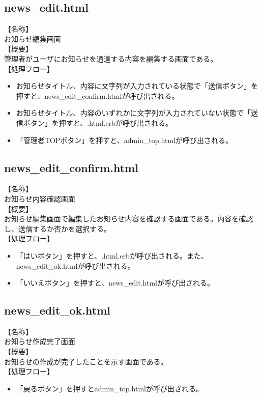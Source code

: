 \documentclass[a4j]{jarticle}
\begin{document}
\subsection{news\_edit.html}
【名称】\\
お知らせ編集画面\\
【概要】\\
管理者がユーザにお知らせを通達する内容を編集する画面である。\\
【処理フロー】\\
\begin{itemize}
  \item お知らせタイトル、内容に文字列が入力されている状態で「送信ボタン」を押すと、news\_edit\_confirm.htmlが呼び出される。
  \item お知らせタイトル、内容のいずれかに文字列が入力されていない状態で「送信ボタン」を押すと、.html.erbが呼び出される。
  \item 「管理者TOPボタン」を押すと、admin\_top.htmlが呼び出される。
\end{itemize}


\subsection{news\_edit\_confirm.html}
【名称】\\
お知らせ内容確認画面\\
【概要】\\
お知らせ編集画面で編集したお知らせ内容を確認する画面である。内容を確認し、送信するか否かを選択する。\\
【処理フロー】\\
\begin{itemize}
  \item 「はいボタン」を押すと、.html.erbが呼び出される。また、news\_edit\_ok.htmlが呼び出される。
  \item 「いいえボタン」を押すと、news\_edit.htmlが呼び出される。
\end{itemize}


\subsection{news\_edit\_ok.html}
【名称】\\
お知らせ作成完了画面\\
【概要】\\
お知らせの作成が完了したことを示す画面である。\\
【処理フロー】\\
\begin{itemize}
  \item 「戻るボタン」を押すとadmin\_top.htmlが呼び出される。
\end{itemize}
\end{document}
